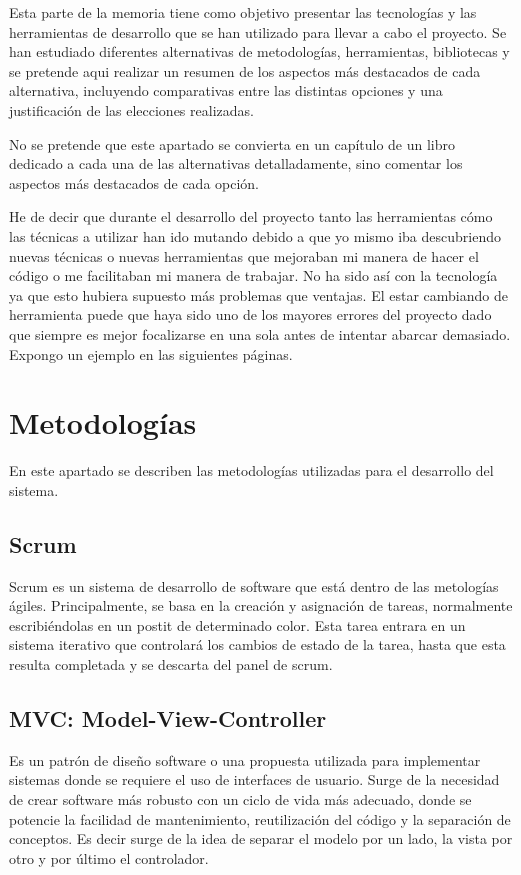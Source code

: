
Esta parte de la memoria tiene como objetivo presentar las tecnologías y las herramientas de desarrollo que se han utilizado para llevar a cabo el proyecto. Se han estudiado diferentes alternativas de metodologías, herramientas, bibliotecas  y se pretende aqui realizar un resumen de los aspectos más destacados de cada alternativa, incluyendo comparativas entre las distintas opciones y una justificación de las elecciones realizadas. 

No se pretende que este apartado se convierta en un capítulo de un libro dedicado a cada una de las alternativas detalladamente, sino comentar los aspectos más destacados de cada opción.

He de decir que durante el desarrollo del proyecto tanto las herramientas cómo las técnicas a utilizar han ido mutando debido a que yo mismo iba descubriendo nuevas técnicas o nuevas herramientas que mejoraban mi manera de hacer el código o me facilitaban mi manera de trabajar. No ha sido así con la tecnología ya que esto hubiera supuesto más problemas que ventajas. El estar cambiando de herramienta puede que haya sido uno de los mayores errores del proyecto dado que siempre es mejor focalizarse en una sola antes de intentar abarcar demasiado. Expongo un ejemplo en las siguientes páginas.


\section{Metodologías}\label{metodologias}
En este apartado se describen las metodologías utilizadas para el desarrollo del sistema.

\subsection{Scrum}\label{scrum}
Scrum es un sistema de desarrollo de software que está dentro de las metologías ágiles. Principalmente, se basa en la creación y asignación de tareas, normalmente escribiéndolas en un postit de determinado color. Esta tarea entrara en un sistema iterativo que controlará los cambios de estado de la tarea, hasta que esta resulta completada y se descarta del panel de scrum.

\subsection{MVC: Model-View-Controller}\label{mvc}
Es un patrón de diseño software o una propuesta utilizada para implementar sistemas donde se requiere el uso de interfaces de usuario. Surge de la necesidad de crear software más robusto con un ciclo de vida más adecuado, donde se potencie la facilidad de mantenimiento, reutilización del código y la separación de conceptos. Es decir surge de la idea de separar el modelo por un lado, la vista por otro y por último el controlador.

